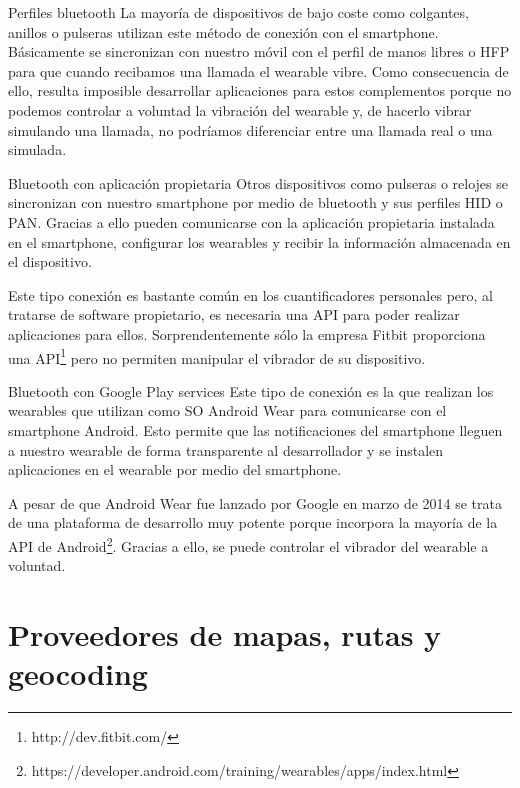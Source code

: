 \begin{definitionlist}
  \item[Perfiles bluetooth] La mayoría de dispositivos de bajo coste como colgantes, anillos o
    pulseras utilizan este método de conexión con el smartphone. Básicamente se sincronizan con
    nuestro móvil con el perfil de manos libres o \acf{HFP} para que cuando recibamos una llamada
    el wearable vibre. Como consecuencia de ello, resulta imposible desarrollar aplicaciones para
    estos complementos porque no podemos controlar a voluntad la vibración del wearable y, de
    hacerlo vibrar simulando una llamada, no podríamos diferenciar entre una llamada real o una
    simulada.

  \item[Bluetooth con aplicación propietaria] Otros dispositivos como pulseras o relojes se
    sincronizan con nuestro smartphone por medio de bluetooth y sus perfiles \acf{HID} o
    \acf{PAN}. Gracias a ello pueden comunicarse con la aplicación propietaria instalada en el
    smartphone, configurar los wearables y recibir la información almacenada en el dispositivo.

    Este tipo conexión es bastante común en los cuantificadores personales pero, al tratarse de
    software propietario, es necesaria una \acs{API} para poder realizar aplicaciones para
    ellos. Sorprendentemente sólo la empresa Fitbit proporciona una
    \acs{API}\footnote{http://dev.fitbit.com/} pero no permiten manipular el vibrador de su
    dispositivo.

  \item[Bluetooth con Google Play services] Este tipo de conexión es la que realizan los wearables
    que utilizan como \acs{SO} Android Wear para comunicarse con el smartphone Android. Esto permite
    que las notificaciones del smartphone lleguen a nuestro wearable de forma transparente al
    desarrollador y se instalen aplicaciones en el wearable por medio del smartphone.

    A pesar de que Android Wear fue lanzado por Google en marzo de 2014 se trata de una plataforma
    de desarrollo muy potente porque incorpora la mayoría de la \acs{API} de
    Android\footnote{https://developer.android.com/training/wearables/apps/index.html}. Gracias a
    ello, se puede controlar el vibrador del wearable a voluntad.
 
\end{definitionlist}

\section{Proveedores de mapas, rutas y geocoding}


